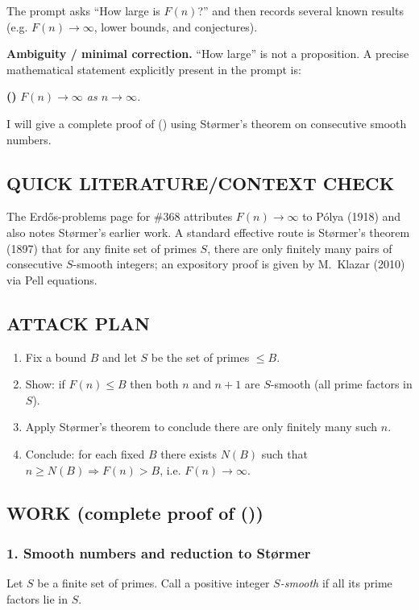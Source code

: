 The prompt asks ``How large is $F(n)$?'' and then records several known results (e.g. $F(n)\to\infty$, lower bounds, and conjectures).

\textbf{Ambiguity / minimal correction.} ``How large'' is not a proposition.
A precise mathematical statement explicitly present in the prompt is:

\medskip
\noindent\textbf{(\*)} \emph{$F(n)\to\infty$ as $n\to\infty$.}

I will give a complete proof of (\*) using St\o rmer's theorem on consecutive smooth numbers.

\subsection*{QUICK LITERATURE/CONTEXT CHECK}
The Erd\H{o}s-problems page for \#368 attributes $F(n)\to\infty$ to P\'olya (1918) and also notes St\o rmer's earlier work. A standard effective route is St\o rmer's theorem (1897) that for any finite set of primes $S$, there are only finitely many pairs of consecutive $S$-smooth integers; an expository proof is given by M.~Klazar (2010) via Pell equations.

\subsection*{ATTACK PLAN}
\begin{enumerate}
\item Fix a bound $B$ and let $S$ be the set of primes $\le B$.
\item Show: if $F(n)\le B$ then both $n$ and $n+1$ are $S$-smooth (all prime factors in $S$).
\item Apply St\o rmer's theorem to conclude there are only finitely many such $n$.
\item Conclude: for each fixed $B$ there exists $N(B)$ such that $n\ge N(B)\Rightarrow F(n)>B$, i.e. $F(n)\to\infty$.
\end{enumerate}

\subsection*{WORK (complete proof of (\*))}
\subsubsection*{1. Smooth numbers and reduction to St\o rmer}
Let $S$ be a finite set of primes. Call a positive integer \emph{$S$-smooth} if all its prime factors lie in $S$.

